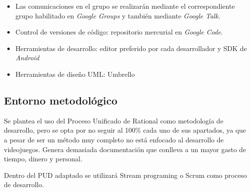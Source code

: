 \begin{itemize}

\item Las comunicaciones en el grupo se realizarán mediante el correspondiente grupo
habilitado en {\em Google Groups} y también mediante {\em Google Talk}.

\item Control de versiones de código: repositorio mercurial en {\em Google Code}.

\item Herramientas de desarrollo: editor preferido por cada desarrollador y SDK
de {\em Android}

\item Herramientas de diseño UML: Umbrello

\end{itemize}

\subsection{Entorno metodológico}

Se plantea el uso del Proceso Unificado de Rational como metodología
de desarrollo, pero se opta por no seguir al 100\% cada uno de sus
apartados, ya que a pesar de ser un método muy completo no está
enfocado al desarrollo de videojuegos. Genera demasiada documentación
que conlleva a un mayor gasto de tiempo, dinero y personal.

Dentro del PUD adaptado se utilizará Stream programing o Scrum como
proceso de desarrollo.

